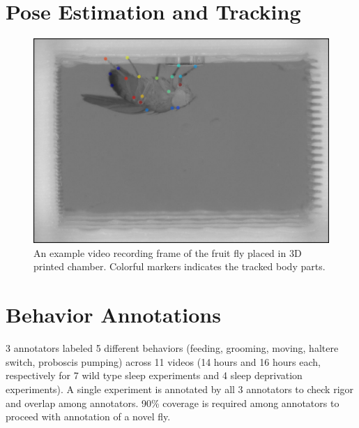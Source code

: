 \section{Pose Estimation and Tracking}

\begin{figure}[ht!]
	\centering
	\includegraphics[width=0.75\linewidth]{figures/FlyTrackedBodyParts.png}
	\caption[An example frame of the fruit fly placed in 3D printed chamber.]{An example video recording frame of the fruit fly placed in 3D printed chamber. Colorful markers indicates the tracked body parts.}
\end{figure}

\section{Behavior Annotations}
3 annotators labeled 5 different behaviors (feeding, grooming, moving, haltere switch, proboscis pumping) across 11 videos (14 hours and 16 hours each, respectively for 7 wild type sleep experiments and 4 sleep deprivation experiments).
A single experiment is annotated by all 3 annotators to check rigor and overlap among annotators.
90\% coverage is required among annotators to proceed with annotation of a novel fly.

